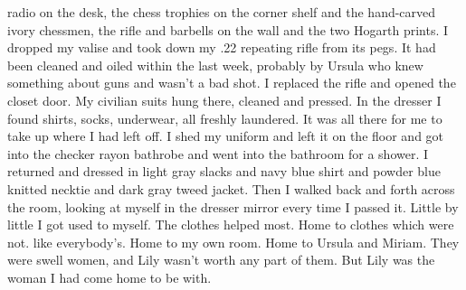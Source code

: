 \documentclass{novel}
\begin{document}
radio on the desk, the chess trophies on the corner shelf and the hand-carved ivory chessmen, the rifle and barbells on the wall and the two Hogarth prints. I dropped my valise and took down my .22 repeating rifle from its pegs. It had been cleaned and oiled within the last week, probably by Ursula who knew something about guns and wasn’t a bad shot. I replaced the rifle and opened the closet door. My civilian suits hung there, cleaned and pressed. In the dresser I found shirts, socks, underwear, all freshly laundered. It was all there for me to take up where I had left off. I shed my uniform and left it on the floor and got into the checker rayon bathrobe and went into the bathroom for a shower. I returned and dressed in light gray slacks and navy blue shirt and powder blue knitted necktie and dark gray tweed jacket. Then I walked back and forth across the room, looking at myself in the dresser mirror every time I passed it. Little by little I got used to myself. The clothes helped most. Home to clothes which were not. like everybody’s. Home to my own room. Home to Ursula and Miriam. They were swell women, and Lily wasn’t worth any part of them. But Lily was the woman I had come home to be with.


\begin{ChapterStart}

\vspace{3\nbs}
\end{ChapterStart}

\end{document}
